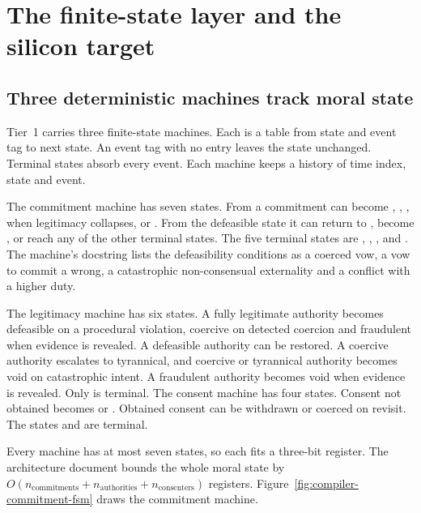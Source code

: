 \section{The finite-state layer and the silicon target}\label{sec:compiler-fsm}

\subsection{Three deterministic machines track moral state}

Tier~1 carries three finite-state machines. Each is a table from state and event tag to next
state. An event tag with no entry leaves the state unchanged. Terminal states absorb every event.
Each machine keeps a history of time index, state and event.

The commitment machine has seven states. From  a commitment can become
, , ,  when legitimacy
collapses, or . From the defeasible state it can return to , become
, or reach any of the other terminal states. The five terminal states are
, , ,  and . The machine's
docstring lists the defeasibility conditions as a coerced vow, a vow to commit a wrong, a
catastrophic non-consensual externality and a conflict with a higher duty.

The legitimacy machine has six states. A fully legitimate authority becomes defeasible on a
procedural violation, coercive on detected coercion and fraudulent when evidence is revealed. A
defeasible authority can be restored. A coercive authority escalates to tyrannical, and coercive
or tyrannical authority becomes void on catastrophic intent. A fraudulent authority becomes void
when evidence is revealed. Only  is terminal. The consent machine has four states. Consent
not obtained becomes  or . Obtained consent can be withdrawn or
coerced on revisit. The states  and  are terminal.

Every machine has at most seven states, so each fits a three-bit register. The architecture
document bounds the whole moral state by
$O(n_{\mathrm{commitments}} + n_{\mathrm{authorities}} + n_{\mathrm{consenters}})$ registers.
Figure~\ref{fig:compiler-commitment-fsm} draws the commitment machine.

